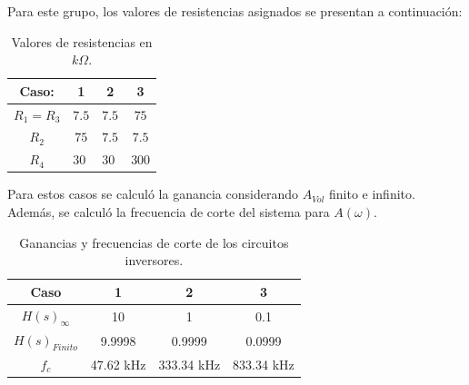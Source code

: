 Para este grupo, los valores de resistencias asignados se presentan a continuación:
\begin{table}[H]
\begin{center}
\begin{tabular}{|c|c|c|c|}
\hline
\textbf{Caso:}              & \textbf{1}               & \textbf{2}               & \textbf{3}                \\ \hline
$R_1=R_3$                   & $7.5$                      & $7.5$                      & $75$                       \\ \hline
$R_2$                       & $75$                       & $7.5$                      & $7.5$                       \\ \hline
\multicolumn{1}{|c|}{$R_4$} & \multicolumn{1}{l|}{$30$} & \multicolumn{1}{l|}{$30$} & \multicolumn{1}{l|}{$300$} \\ \hline
\end{tabular}
\caption{Valores de resistencias en $k\Omega$.}
\label{tabla:resasignadas}
\end{center}
\end{table}

Para estos casos se calculó la ganancia considerando $A_{Vol}$ finito e infinito. Además, se calculó la frecuencia de corte del sistema para $A(\omega)$.

\begin{table}[H]
\begin{center}
\begin{tabular}{|c|c|c|c|}
\hline
\textbf{Caso}            & \textbf{1} & \textbf{2} & \textbf{3} \\ \hline
\textbf{$H(s)_{\infty}$} & 10         & 1          & 0.1        \\ \hline
\textbf{$H(s)_{Finito}$} & 9.9998     & 0.9999     & 0.0999     \\ \hline
\textbf{$f_c$}           & 47.62 kHz   & 333.34 kHz  & 833.34 kHz     \\ \hline
\end{tabular}
\caption{Ganancias y frecuencias de corte de los circuitos inversores.}
\label{tabla:gananciasinv}
\end{center}
\end{table}

